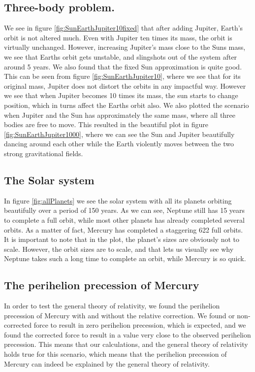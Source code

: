 \documentclass[../main.tex]{subfiles}
\begin{document}
\subsection{Three-body problem.}
We see in figure \ref{fig:SunEarthJupiter10fixed} that after adding Jupiter, Earth's orbit is not altered much. Even with Jupiter ten times its mass, the orbit is virtually unchanged. However, increasing Jupiter's mass close to the Suns mass, we see that Earths orbit gets unstable, and slingshots out of the system after around 5 years.
We also found that the fixed Sun approximation is quite good. This can be seen from figure \ref{fig:SunEarthJupiter10}, where we see that for its original mass, Jupiter does not distort the orbits in any impactful way. However we see that when Jupiter becomes 10 times its mass, the sun starts to change position, which in turns affect the Earths orbit also. We also plotted the scenario when Jupiter and the Sun has approximately the same mass, where all three bodies are free to move. This resulted in the beautiful plot in figure \ref{fig:SunEarthJupiter1000}, where we can see the Sun and Jupiter beautifully dancing around each other while the Earth violently moves between the two strong gravitational fields.

\subsection{The Solar system}
In figure \ref{fig:allPlanets} we see the solar system with all its planets orbiting beautifully over a period of 150 years. As we can see, Neptune still has 15 years to complete a full orbit, while most other planets has already completed several orbits. As a matter of fact, Mercury has completed a staggering 622 full orbits. \\
It is important to note that in the plot, the planet's sizes are obviously not to scale. However, the orbit sizes are to scale, and that lets us visually see why Neptune takes such a long time to complete an orbit, while Mercury is so quick.
\iffalse
When making a simulation of the different planets in our Solar system, it would be strange if we did not look at the whole system together. The orbit of all the planets in The Solar system is plotted in figure \ref{fig:allPlanets}. As expected(studied in real life) they all move around the Sun in a somewhat circular/elliptical orbit during our simulation.
\fi

\subsection{The perihelion precession of Mercury}
In order to test the general theory of relativity, we found the perihelion precession of Mercury with and without the relative correction. We found or non-corrected force to result in zero perihelion precession, which is expected, and we found the corrected force to result in a value very close to the observed perihelion precession. This means that our calculations, and the general theory of relativity holds true for this scenario, which means that the perihelion precession of Mercury can indeed be explained by the general theory of relativity.
\end{document}
